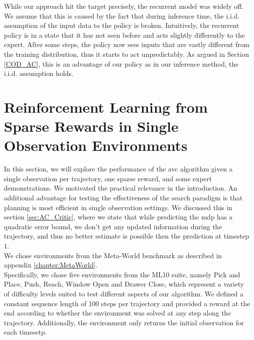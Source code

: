 While our approach hit the target precisely, the recurrent model was widely off. We assume that this is caused by the fact that during inference 
time, the
i.i.d. assumption of the input data to the policy is broken. Intuitively, the recurrent policy
is in a state that it has not seen before and acts slightly differently to the expert. After some steps, the policy now sees 
inputs that are vastly
different from the training distribution, thus it starts to act unpredictably. As argued in Section \ref{COD_AC}, this is an advantage of our 
policy as in our inference method, the i.i.d. assumption holds.

\section{Reinforcement Learning from Sparse Rewards in Single Observation Environments}
In this section, we will explore the performance of the \ac{avc} algorithm given a single observation per trajectory, one sparse reward, and some expert demonstrations.
We motivated the practical relevance in the introduction. An additional advantage for testing the effectiveness of the search paradigm is that planning is most efficient in
single observation settings.
We discussed this in section \ref{sec:AC_Critic}, where we state that while predicting the \ac{mdp} has a quadratic error bound, we don't get any updated information
during the trajectory, and thus no better estimate is possible then the prediction at timestep $1$. \\

We chose environments from the Meta-World benchmark as described in appendix \ref{chapter:MetaWorld}. \\

Specifically, we chose five environments from the ML10 suite, namely Pick and Place, Push, Reach, Window Open and Drawer Close, which represent a variety
of difficulty levels suited to test different aspects of our algorithm. We defined a constant sequence length of 100 steps per trajectory and provided
a reward at the end according to whether the environment was solved at any step along the trajectory. Additionally, the environment
only returns the initial observation for each timesetp.\\

